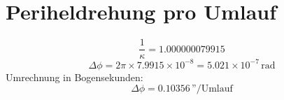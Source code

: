 \section{Periheldrehung pro Umlauf}
\[
\frac{1}{\kappa} = 1.000000079915
\]
\[
\Delta \phi = 2\pi \times 7.9915 \times 10^{-8} = 5.021 \times 10^{-7}\, \text{rad}
\]
Umrechnung in Bogensekunden:
\[
\Delta \phi = 0.10356\, \text{''/Umlauf}
\]